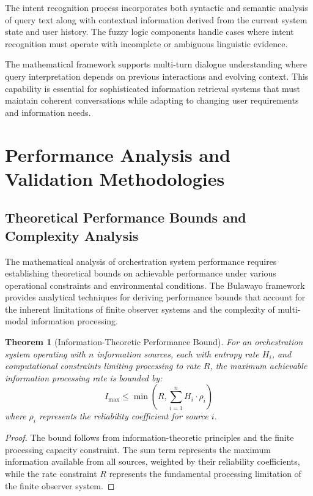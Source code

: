\documentclass[12pt,a4paper]{article}
\newtheorem{theorem}{Theorem}[section]
\begin{document}
{{{The intent recognition process incorporates both syntactic and semantic analysis of query text along with contextual information derived from the current system state and user history. The fuzzy logic components handle cases where intent recognition must operate with incomplete or ambiguous linguistic evidence.

The mathematical framework supports multi-turn dialogue understanding where query interpretation depends on previous interactions and evolving context. This capability is essential for sophisticated information retrieval systems that must maintain coherent conversations while adapting to changing user requirements and information needs.

\section{Performance Analysis and Validation Methodologies}

\subsection{Theoretical Performance Bounds and Complexity Analysis}

The mathematical analysis of orchestration system performance requires establishing theoretical bounds on achievable performance under various operational constraints and environmental conditions. The Bulawayo framework provides analytical techniques for deriving performance bounds that account for the inherent limitations of finite observer systems and the complexity of multi-modal information processing.

\begin{theorem}[Information-Theoretic Performance Bound]
For an orchestration system operating with $n$ information sources, each with entropy rate $H_i$, and computational constraints limiting processing to rate $R$, the maximum achievable information processing rate is bounded by:
\begin{equation}
I_{\text{max}} \leq \min\left(R, \sum_{i=1}^{n} H_i \cdot \rho_i\right)
\end{equation}
where $\rho_i$ represents the reliability coefficient for source $i$.
\end{theorem}

\begin{proof}
The bound follows from information-theoretic principles and the finite processing capacity constraint. The sum term represents the maximum information available from all sources, weighted by their reliability coefficients, while the rate constraint $R$ represents the fundamental processing limitation of the finite observer system.


\end{proof}}}}
\end{document}
